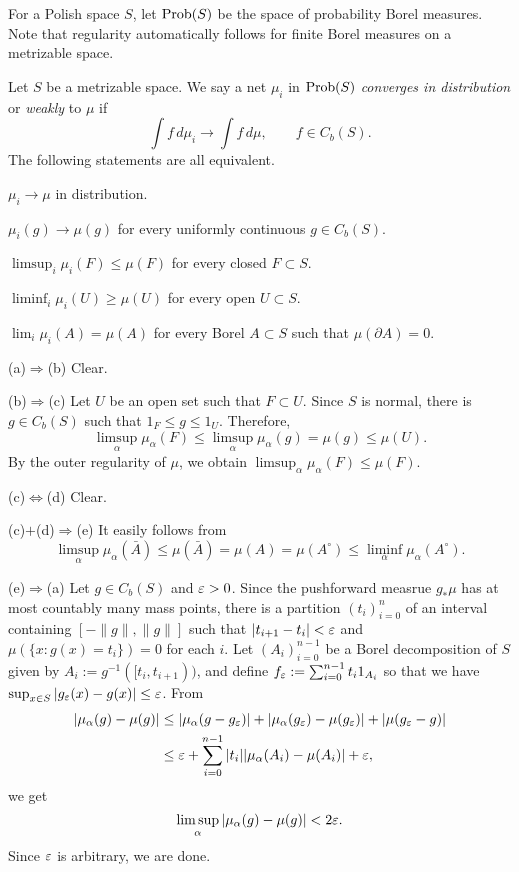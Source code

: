 \documentclass{../../large}
\begin{document}
For a Polish space $S$, let $\operatorname{Prob}(S)$ be the space of probability Borel measures.
Note that regularity automatically follows for finite Borel measures on a metrizable space.



\begin{prb}
Let $S$ be a metrizable space.
We say a net $\mu_i$ in $\operatorname{Prob}(S)$ \emph{converges in distribution} or \emph{weakly} to $\mu$ if
\[\int f\,d\mu_i\to\int f\,d\mu,\qquad f\in C_b(S).\]
The following statements are all equivalent.
\begin{parts}
\item $\mu_i\to\mu$ in distribution.
\item $\mu_i(g)\to\mu(g)$ for every uniformly continuous $g\in C_b(S)$.
\item $\limsup_i\mu_i(F)\le\mu(F)$ for every closed $F\subset S$.
\item $\liminf_i\mu_i(U)\ge\mu(U)$ for every open $U\subset S$.
\item $\lim_i\mu_i(A)=\mu(A)$ for every Borel $A\subset S$ such that $\mu(\partial A)=0$.
\end{parts}
\end{prb}
\begin{pf}
(a)$\Rightarrow$(b)
Clear.

(b)$\Rightarrow$(c)
Let $U$ be an open set such that $F\subset U$.
Since $S$ is normal, there is $g\in C_b(S)$ such that $1_F\le g\le1_U$.
Therefore,
\[\limsup_\alpha\mu_\alpha(F)\le\limsup_\alpha\mu_\alpha(g)=\mu(g)\le\mu(U).\]
By the outer regularity of $\mu$, we obtain $\limsup_\alpha\mu_\alpha(F)\le\mu(F)$.

(c)$\Leftrightarrow$(d)
Clear.

(c)$+$(d)$\Rightarrow$(e)
It easily follows from
\[\limsup_\alpha\mu_\alpha(\bar A)\le\mu(\bar A)=\mu(A)=\mu(A^\circ)\le\liminf_\alpha\mu_\alpha(A^\circ).\]

(e)$\Rightarrow$(a)
Let $g\in C_b(S)$ and $\varepsilon>0$.
Since the pushforward measrue $g_*\mu$ has at most countably many mass points, there is a partition $(t_i)_{i=0}^n$ of an interval containing $[-\|g\|,\|g\|]$ such that $|t_{i+1}-t_i|<\varepsilon$ and $\mu(\{x:g(x)=t_i\})=0$ for each $i$.
Let $(A_i)_{i=0}^{n-1}$ be a Borel decomposition of $S$ given by $A_i:=g^{-1}([t_i,t_{i+1}))$, and define $f_\varepsilon:=\sum_{i=0}^{n-1}t_i1_{A_i}$ so that we have $\sup_{x\in S}|g_\varepsilon(x)-g(x)|\le\varepsilon$.
From
\begin{align*}
|\mu_\alpha(g)-\mu(g)|&\le|\mu_\alpha(g-g_\varepsilon)|+|\mu_\alpha(g_\varepsilon)-\mu(g_\varepsilon)|+|\mu(g_\varepsilon-g)|\\
&\le\varepsilon+\sum_{i=0}^{n-1}|t_i||\mu_\alpha(A_i)-\mu(A_i)|+\varepsilon,
\end{align*}
we get
\[\limsup_\alpha|\mu_\alpha(g)-\mu(g)|<2\varepsilon.\]
Since $\varepsilon$ is arbitrary, we are done.
\end{pf}
\end{document}
